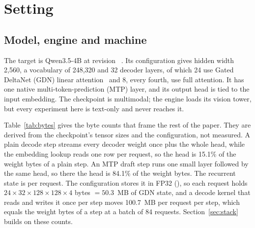 \section{Setting}\label{sec:setting}
\subsection{Model, engine and machine}\label{sec:setting-model}
The target is Qwen3.5-4B at revision \modelpin~\cite{qwenconfig,qwencard}. Its configuration gives hidden width 2,560, a vocabulary of 248,320 and 32 decoder layers, of which 24 use Gated DeltaNet (GDN) linear attention~\cite{gdn} and 8, every fourth, use full attention. It has one native multi-token-prediction (MTP) layer, and its output head is tied to the input embedding. The checkpoint is multimodal; the engine loads its vision tower, but every experiment here is text-only and never reaches it.

Table~\ref{tab:bytes} gives the byte counts that frame the rest of the paper. They are derived from the checkpoint's tensor sizes and the configuration, not measured. A plain decode step streams every decoder weight once plus the whole head, while the embedding lookup reads one row per request, so the head is 15.1\% of the weight bytes of a plain step. An MTP draft step runs one small layer followed by the same head, so there the head is 84.1\% of the weight bytes. The recurrent state is per request. The configuration stores it in FP32 (), so each request holds $24\times32\times128\times128\times4$ bytes $=50.3$~MB of GDN state, and a decode kernel that reads and writes it once per step moves 100.7~MB per request per step, which equals the weight bytes of a step at a batch of 84 requests. Section~\ref{sec:stack} builds on these counts.

